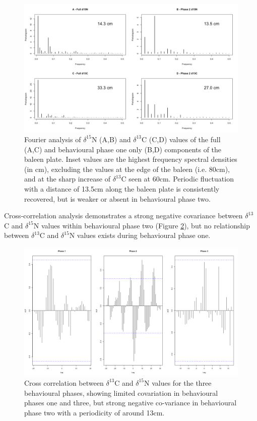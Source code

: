 \documentclass[a4paper,12pt]{article}
\begin{document}
\begin{figure}[!htbp]
  \centering
  \includegraphics[width = \linewidth]{figures/Figure-S1-periodograms.png}
  \caption{Fourier analysis of $\delta^{15}$N (A,B) and $\delta^{13}$C (C,D) values of the full (A,C) and behavioural phase one only (B,D) components of the baleen plate. Inset values are the highest frequency spectral densities (in cm), excluding the values at the edge of the baleen (i.e. 80cm), and at the sharp increase of $\delta^{13}$C seen at 60cm. Periodic fluctuation with a distance of 13.5cm along the baleen plate is consistently recovered, but is weaker or absent in behavioural phase two.} 
  \label{figs1}
\end{figure}
 
Cross-correlation analysis demonstrates a strong negative covariance between $\delta^{13}$C and $\delta^{15}$N  values within behavioural phase two (Figure \ref{figs2}), but no relationship between $\delta^{13}$C and $\delta^{15}$N values exists during behavioural phase one.

\begin{figure}[!htbp]
  \centering
  \includegraphics[width = \linewidth]{figures/Figure-S2-cross-cor.png}
  \caption{Cross correlation between $\delta^{13}$C and $\delta^{15}$N values for the three behavioural phases, showing limited covariation in behavioural phases one and three, but strong negative co-variance in behavioural phase two with a periodicity of around 13cm.
  }
  \label{figs2}
\end{figure}
 
\end{document}
